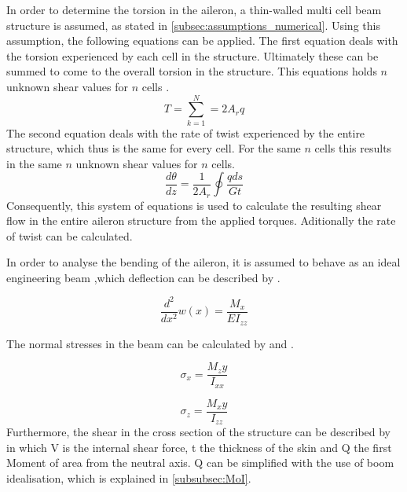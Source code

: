 In order to determine the torsion in the aileron, a thin-walled multi cell beam structure is assumed, as stated in \autoref{subsec:assumptions_numerical}. Using this assumption, the following equations can be applied. The first equation deals with the torsion experienced by each cell in the structure. Ultimately these can be summed to come to the overall torsion in the structure. This equations holds $n$ unknown shear values for $n$ cells \cite{the_book}.
\begin{equation}
    T=\sum_{k=1}^{N}=2 A_{r} q
\end{equation}
The second equation deals with the rate of twist experienced by the entire structure, which thus is the same for every cell. For the same $n$ cells this results in the same $n$ unknown shear values for $n$ cells.
\begin{equation}
    \frac{d \theta}{d z}=\frac{1}{2 A_{r}} \oint \frac{q d s}{G t}
\end{equation}
Consequently, this system of equations is used to calculate the resulting shear flow in the entire aileron structure from the applied torques. Aditionally the rate of twist can be calculated.\par
In order to analyse the bending of the aileron, it is assumed to behave as an ideal engineering beam ,which deflection can be described by  \cite{the_book}.

\begin{equation}
    \frac{d^2}{d x^2}w(x) = \frac{M_x}{E I_{zz}}
    \label{eq:Beamformula}
\end{equation}

The normal stresses in the beam can be calculated by  and  \cite{the_book}.

\begin{equation}
    \sigma_x = \frac{M_z y}{I_{xx}}
    \label{eq:stress_bending}
\end{equation}

\begin{equation}
    \sigma_z = \frac{M_x y}{I_{zz}}
    \label{eq:stress_bending}
\end{equation}
Furthermore, the shear in the cross section of the structure can be described by  in which V is the internal shear force,  t the thickness of the skin and Q the first Moment of area from the neutral axis\cite{the_book}. Q can be simplified with the use of boom idealisation, which is explained in \autoref{subsubsec:MoI}. 

